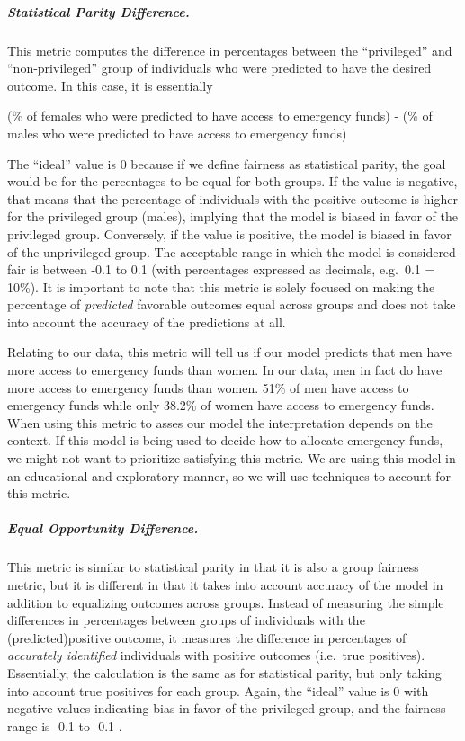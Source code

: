 \documentclass[water,article,submit,moreauthors,pdftex]{mdpi}
\begin{document}
\hypertarget{statistical-parity-difference.}{%
\subparagraph{Statistical Parity
Difference.}\label{statistical-parity-difference.}}

This metric computes the difference in percentages between the
``privileged'' and ``non-privileged'' group of individuals who were
predicted to have the desired outcome. In this case, it is essentially

(\% of females who were predicted to have access to emergency funds) -
(\% of males who were predicted to have access to emergency funds)

The ``ideal'' value is 0 because if we define fairness as statistical
parity, the goal would be for the percentages to be equal for both
groups. If the value is negative, that means that the percentage of
individuals with the positive outcome is higher for the privileged group
(males), implying that the model is biased in favor of the privileged
group. Conversely, if the value is positive, the model is biased in
favor of the unprivileged group. The acceptable range in which the model
is considered fair is between -0.1 to 0.1 (with percentages expressed as
decimals, e.g.~0.1 = 10\%). It is important to note that this metric is
solely focused on making the percentage of \emph{predicted} favorable
outcomes equal across groups and does not take into account the accuracy
of the predictions at all.\citep{caton2020fairness, kypraiou_what_2021}

Relating to our data, this metric will tell us if our model predicts
that men have more access to emergency funds than women. In our data,
men in fact do have more access to emergency funds than women. 51\% of
men have access to emergency funds while only 38.2\% of women have
access to emergency funds. When using this metric to asses our model the
interpretation depends on the context. If this model is being used to
decide how to allocate emergency funds, we might not want to prioritize
satisfying this metric. We are using this model in an educational and
exploratory manner, so we will use techniques to account for this
metric.

\hypertarget{equal-opportunity-difference.}{%
\subparagraph{Equal Opportunity
Difference.}\label{equal-opportunity-difference.}}

This metric is similar to statistical parity in that it is also a group
fairness metric, but it is different in that it takes into account
accuracy of the model in addition to equalizing outcomes across groups.
Instead of measuring the simple differences in percentages between
groups of individuals with the (predicted)positive outcome, it measures
the difference in percentages of \emph{accurately identified}
individuals with positive outcomes (i.e.~true positives). Essentially,
the calculation is the same as for statistical parity, but only taking
into account true positives for each group. Again, the ``ideal'' value
is 0 with negative values indicating bias in favor of the privileged
group, and the fairness range is -0.1 to -0.1 \citep{caton2020fairness}.
\end{document}

